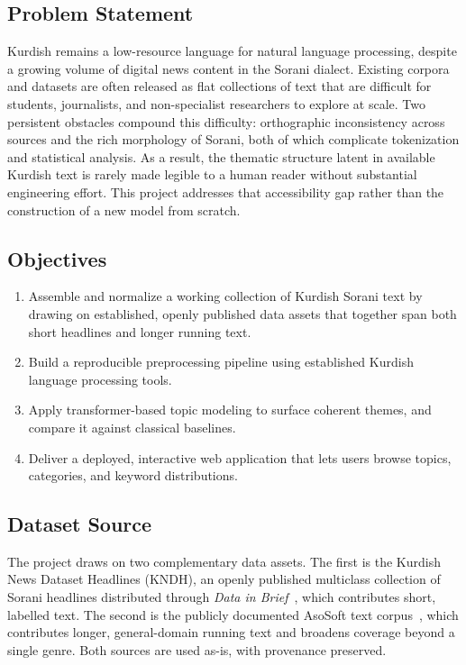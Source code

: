 \documentclass[12pt,a4paper]{article}
\begin{document}
\subsection{Problem Statement}
Kurdish remains a low-resource language for natural language processing, despite a growing volume of digital news content in the Sorani dialect. Existing corpora and datasets are often released as flat collections of text that are difficult for students, journalists, and non-specialist researchers to explore at scale. Two persistent obstacles compound this difficulty: orthographic inconsistency across sources and the rich morphology of Sorani, both of which complicate tokenization and statistical analysis. As a result, the thematic structure latent in available Kurdish text is rarely made legible to a human reader without substantial engineering effort. This project addresses that accessibility gap rather than the construction of a new model from scratch.

\subsection{Objectives}
\begin{enumerate}
  \item Assemble and normalize a working collection of Kurdish Sorani text by drawing on established, openly published data assets that together span both short headlines and longer running text.
  \item Build a reproducible preprocessing pipeline using established Kurdish language processing tools.
  \item Apply transformer-based topic modeling to surface coherent themes, and compare it against classical baselines.
  \item Deliver a deployed, interactive web application that lets users browse topics, categories, and keyword distributions.
\end{enumerate}

\subsection{Dataset Source}
The project draws on two complementary data assets. The first is the Kurdish News Dataset Headlines (KNDH), an openly published multiclass collection of Sorani headlines distributed through \emph{Data in Brief}~\cite{badawiKurdishNewsDataset2023}, which contributes short, labelled text. The second is the publicly documented AsoSoft text corpus~\cite{veisiKurdishLanguageProcessing2019}, which contributes longer, general-domain running text and broadens coverage beyond a single genre. Both sources are used as-is, with provenance preserved.
\end{document}
